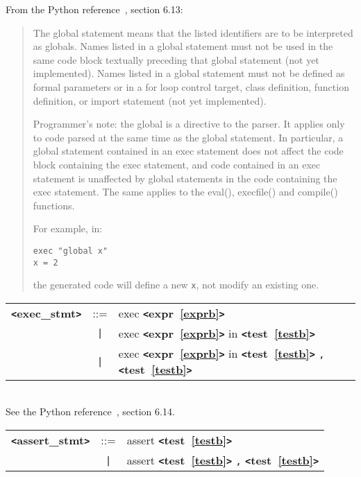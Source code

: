 From the Python reference~\cite{pythonlang}, section 6.13:
\begin{quote}
The global statement means that the listed identifiers are to be interpreted as globals.
Names listed in a global statement must not be used in the same code block 
textually preceding that global statement (not yet implemented). Names listed in a global statement must not be defined as formal parameters or in a for loop control target, class definition, function definition, or import statement (not yet implemented).

Programmer's note: the global is a directive to the parser. 
It applies only to code parsed at the same time as the global statement. 
In particular, a global statement contained in an exec statement does not 
affect the code block containing the exec statement, and code contained in 
an exec statement is unaffected by global statements in the code containing 
the exec statement. The same applies to the eval(), execfile() and compile() 
functions.

For example, in:
\begin{verbatim}
exec "global x"
x = 2
\end{verbatim}
the generated code will define a new \verb|x|, not modify an existing one.
\end{quote}

\label{execzzzstmtb}
\begin{tabular}{lcl}
{\bf \verb+<+exec\_stmt\verb+>+} & ::=  & exec {\bf \verb+<+expr~\ref{exprb}\verb+>+}  \\
 & \verb+|+  & exec {\bf \verb+<+expr~\ref{exprb}\verb+>+}  in {\bf \verb+<+test~\ref{testb}\verb+>+}  \\
 & \verb+|+  & exec {\bf \verb+<+expr~\ref{exprb}\verb+>+}  in {\bf \verb+<+test~\ref{testb}\verb+>+}  \verb|,| {\bf \verb+<+test~\ref{testb}\verb+>+}  \\
\end{tabular} \\

See the Python reference~\cite{pythonlang}, section 6.14.

\label{assertzzzstmtb}
\begin{tabular}{lcl}
{\bf \verb+<+assert\_stmt\verb+>+} & ::=  & assert {\bf \verb+<+test~\ref{testb}\verb+>+}  \\
 & \verb+|+  & assert {\bf \verb+<+test~\ref{testb}\verb+>+}  \verb|,| {\bf \verb+<+test~\ref{testb}\verb+>+}  \\
\end{tabular} \\

